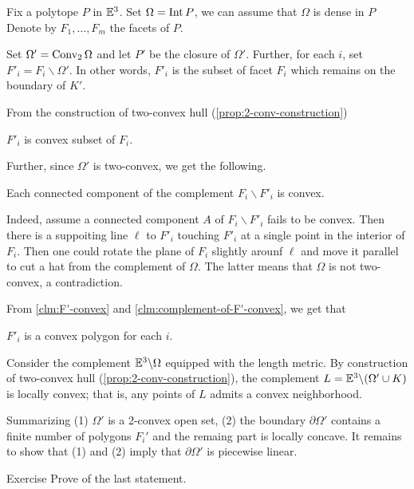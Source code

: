 Fix a polytope $P$ in $\mathbb{E}^3$.
Set $\Omega=\mathop{\rm Int}\nolimits P$, we can assume that $\Omega$ is dense in $P$
Denote by $F_1,\dots,F_m$ the facets of $P$.

Set $\Omega'=\mathop{\rm Conv}\nolimits_2\Omega$ and let $P'$ be the closure of $\Omega'$.
Further, 
for each $i$, 
set $F'_i=F_i\backslash \Omega'$.
In other words, 
$F'_i$ is the subset of facet $F_i$ 
which remains on the boundary of $K'$.

From the construction of two-convex hull (\ref{prop:2-conv-construction})

\begin{clm}{}\label{clm:F'-convex}
$F'_i$ is convex subset of $F_i$.
\end{clm}

Further, since $\Omega'$ is two-convex,
we get the following.

\begin{clm}{}\label{clm:complement-of-F'-convex}
Each connected component of the complement $F_i\backslash F'_i$ is convex.
\end{clm}

Indeed, assume a connected component $A$ of $F_i\backslash F'_i$ fails to be convex.
Then there is a suppoiting line $\ell$ to $F'_i$ touching $F'_i$ at a single point in the interior of $F_i$.
Then one could rotate the plane of $F_i$ slightly arounf $\ell$ and move it parallel to cut a hat from the complement of $\Omega$.
The latter means that $\Omega$ is not two-convex, 
a contradiction.
\claimqeds

From \ref{clm:F'-convex} and \ref{clm:complement-of-F'-convex}, we get that 

\begin{clm}{}$F'_i$ is a convex polygon for each $i$.
\end{clm}

Consider the complement 
$\mathbb{E}^3\backslash \Omega$ 
equipped with the length metric.
By construction of two-convex hull (\ref{prop:2-conv-construction}), 
the complement $L=\EE^3\backslash (\Omega'\cup K)$
is locally convex;
that is, any points of $L$ admits a convex neighborhood.

Summarizing (1)
$\Omega'$ is a 2-convex open set,
(2) the boundary $\partial\Omega'$ 
contains a finite number of polygons $F_i'$
and the remaing part is locally concave.
It remains to show that (1) and (2) imply that $\partial\Omega'$
is piecewise linear.

\begin{thm}{Exercise}\label{ex:convex+saddle+broken=>PL}
Prove of the last statement.\qeds
\end{thm}


